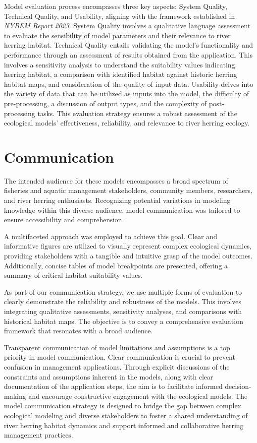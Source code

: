\documentclass[
]{book}
\begin{document}
Model evaluation process encompasses three key aspects: System Quality, Technical Quality, and Usability, aligning with the framework established in \emph{NYBEM Report 2023}. System Quality involves a qualitative language assessment to evaluate the sensibility of model parameters and their relevance to river herring habitat. Technical Quality entails validating the model's functionality and performance through an assessment of results obtained from the application. This involves a sensitivity analysis to understand the suitability values indicating herring habitat, a comparison with identified habitat against historic herring habitat maps, and consideration of the quality of input data. Usability delves into the variety of data that can be utilized as inputs into the model, the difficulty of pre-processing, a discussion of output types, and the complexity of post-processing tasks. This evaluation strategy ensures a robust assessment of the ecological models' effectiveness, reliability, and relevance to river herring ecology.

\hypertarget{communication}{%
\section{Communication}\label{communication}}

The intended audience for these models encompasses a broad spectrum of fisheries and aquatic management stakeholders, community members, researchers, and river herring enthusiasts. Recognizing potential variations in modeling knowledge within this diverse audience, model communication was tailored to ensure accessibility and comprehension.

A multifaceted approach was employed to achieve this goal. Clear and informative figures are utilized to visually represent complex ecological dynamics, providing stakeholders with a tangible and intuitive grasp of the model outcomes. Additionally, concise tables of model breakpoints are presented, offering a summary of critical habitat suitability values.

As part of our communication strategy, we use multiple forms of evaluation to clearly demonstrate the reliability and robustness of the models. This involves integrating qualitative assessments, sensitivity analyses, and comparisons with historical habitat maps. The objective is to convey a comprehensive evaluation framework that resonates with a broad audience.

Transparent communication of model limitations and assumptions is a top priority in model communication. Clear communication is crucial to prevent confusion in management applications. Through explicit discussions of the constraints and assumptions inherent in the models, along with clear documentation of the application steps, the aim is to facilitate informed decision-making and encourage constructive engagement with the ecological models. The model communication strategy is designed to bridge the gap between complex ecological modeling and diverse stakeholders to foster a shared understanding of river herring habitat dynamics and support informed and collaborative herring management practices.
\end{document}
